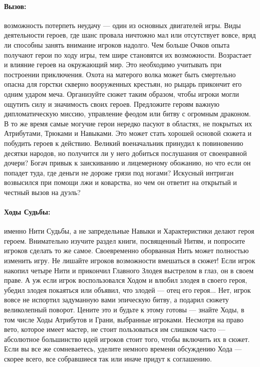 \paragraph{Вызов:} возможность потерпеть неудачу — один из основных двигателей игры. Виды деятельности героев, где шанс провала ничтожно мал или отсутствует вовсе, вряд ли способны занять внимание игроков надолго.
\newline
Чем больше Очков опыта получают герои по ходу игры, тем шире становятся их возможности. Возрастает и влияние героев на окружающий мир. Это необходимо учитывать при построении приключения. Охота на матерого волка может быть смертельно опасна для горстки скверно вооруженных крестьян, но рыцарь прикончит его одним ударом меча. Организуйте сюжет таким образом, чтобы игроки могли ощутить силу и значимость своих героев. Предложите героям важную дипломатическую миссию, управление феодом или битву с огромным драконом.
\newline
В то же время самые могучие герои нередко пасуют в областях, не покрытых их Атрибутами, Трюками и Навыками. Это может стать хорошей основой сюжета и побудить героев к действию. Великий военачальник принудил к повиновению десятки народов, но получится ли у него добиться послушания от своенравной дочери? Богач привык к заискиванию и лицемерному обожанию, но что если он попадет туда, где деньги не дороже грязи под ногами? Искусный интриган возвысился при помощи лжи и коварства, но чем он ответит на открытый и честный вызов
на дуэль?
\paragraph{Ходы Судьбы:} именно Нити Судьбы, а не запредельные Навыки и Характеристики делают героя героем. Внимательно изучите раздел книги, посвященный Нитям, и попросите игроков сделать то же самое. Своевременно оборванная Нить может полностью изменить игру. Не лишайте игроков возможности вмешаться в сюжет! Если игрок накопил четыре Нити и прикончил Главного Злодея выстрелом в глаз, он в своем праве. А уж если игрок воспользовался Ходом и влюбил злодея в своего героя, убедил злодея покаяться или объявил, что злодей — отец его героя... Нет, игрок вовсе не испортил задуманную вами эпическую битву, а подарил сюжету великолепный поворот. Цените это и будьте к этому готовы — знайте Ходы, в том числе Ходы Атрибутов и Грани, выбранные игроками. Несмотря на право вето, которое имеет мастер, не стоит пользоваться им слишком часто — абсолютное большинство идей игроков стоит того, чтобы включить их в сюжет. Если вы все же сомневаетесь, уделите немного времени обсуждению Хода — скорее всего, все собравшиеся так или иначе придут к соглашению.
